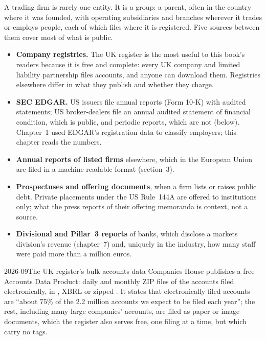 A trading firm is rarely one entity. It is a group: a parent, often in the country where it was founded, with operating
subsidiaries and branches wherever it trades or employs people, each of which files where it is registered. Five
sources between them cover most of what is public.
\begin{itemize}
\item \textbf{Company registries.} The UK register is the most useful to this book's readers because it is free and
complete: every UK company and limited liability partnership files accounts, and anyone can download them. Registries
elsewhere differ in what they publish and whether they charge.
\item \textbf{SEC EDGAR.} US issuers file annual reports (Form 10-K) with audited statements; US broker-dealers file an
annual audited statement of financial condition, which is public, and periodic reports, which are not (below).
Chapter~1 used EDGAR's registration data to classify employers; this chapter reads the numbers.
\item \textbf{Annual reports of listed firms} elsewhere, which in the European Union are filed in a machine-readable
format (section~3).
\item \textbf{Prospectuses and offering documents}, when a firm lists or raises public debt. Private placements under
the US Rule~144A are offered to institutions only; what the press reports of their offering memoranda is context, not a
source.
\item \textbf{Divisional and Pillar~3 reports} of banks, which disclose a markets division's revenue (chapter~7) and,
uniquely in the industry, how many staff were paid more than a million euros.
\end{itemize}

\begin{dated}{2026-09}{The UK register's bulk accounts data}\label{dat:in:reading-a-trading-firms-accounts:registry}
Companies House publishes a free Accounts Data Product: daily and monthly ZIP files of the accounts filed electronically,
in , XBRL or zipped . It states that electronically filed accounts are ``about 75\% of the 2.2
million accounts we expect to be filed each year''; the rest, including many large companies' accounts, are filed as
paper or image documents, which the register also serves free, one filing at a time, but which carry no tags.
\end{dated}

